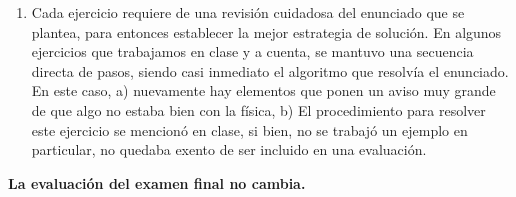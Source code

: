 \begin{enumerate}
\item Cada ejercicio requiere de una revisión cuidadosa del enunciado que se plantea, para entonces establecer la mejor estrategia de solución. En algunos ejercicios que trabajamos en clase y a cuenta, se mantuvo una secuencia directa de pasos, siendo casi inmediato el algoritmo que resolvía el enunciado. En este caso, a) nuevamente hay elementos que ponen un aviso muy grande de que algo no estaba bien con la física, b) El procedimiento para resolver este ejercicio se mencionó en clase, si bien, no se trabajó un ejemplo en particular, no quedaba exento de ser incluido en una evaluación.
\end{enumerate}
\textbf{La evaluación del examen final no cambia.}



